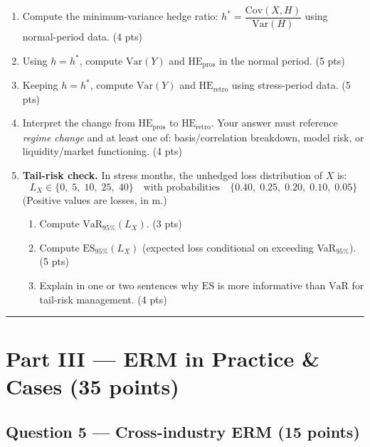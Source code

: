 \documentclass[11pt,a4paper]{article}
\begin{document}
\begin{enumerate}
  \item[(a)] Compute the minimum-variance hedge ratio:
  $h^* = \dfrac{\mathrm{Cov}(X,H)}{\mathrm{Var}(H)}$ using normal-period data. \hfill (4 pts)

  \item[(b)] Using $h = h^*$, compute $\mathrm{Var}(Y)$ and $\text{HE}_{\text{pros}}$ in the normal period. \hfill (5 pts)

  \item[(c)] Keeping $h = h^*$, compute $\mathrm{Var}(Y)$ and $\text{HE}_{\text{retro}}$ using stress-period data. \hfill (5 pts)

  \item[(d)] Interpret the change from $\text{HE}_{\text{pros}}$ to $\text{HE}_{\text{retro}}$.
  Your answer must reference \emph{regime change} and at least one of:
  basis/correlation breakdown, model risk, or liquidity/market functioning. \hfill (4 pts)

  \item[(e)] \textbf{Tail-risk check.} In stress months, the unhedged loss distribution of $X$ is:
  \[
  L_X \in \{0,\; 5,\; 10,\; 25,\; 40\} \quad \text{with probabilities} \quad
  \{0.40,\; 0.25,\; 0.20,\; 0.10,\; 0.05\}
  \]
  (Positive values are losses, in \texteuro{}m.)
  \begin{enumerate}
    \item[(i)] Compute $\mathrm{VaR}_{95\%}(L_X)$. \hfill (3 pts)
    \item[(ii)] Compute $\mathrm{ES}_{95\%}(L_X)$ (expected loss conditional on exceeding VaR$_{95\%}$). \hfill (5 pts)
    \item[(iii)] Explain in one or two sentences why $\mathrm{ES}$ is more informative than $\mathrm{VaR}$ for tail-risk management. \hfill (4 pts)
  \end{enumerate}
\end{enumerate}

\vspace{2mm}
\hrule

\section*{Part III --- ERM in Practice \& Cases \hfill (35 points)}

\subsection*{Question 5 --- Cross-industry ERM \hfill (15 points)}
\end{document}
